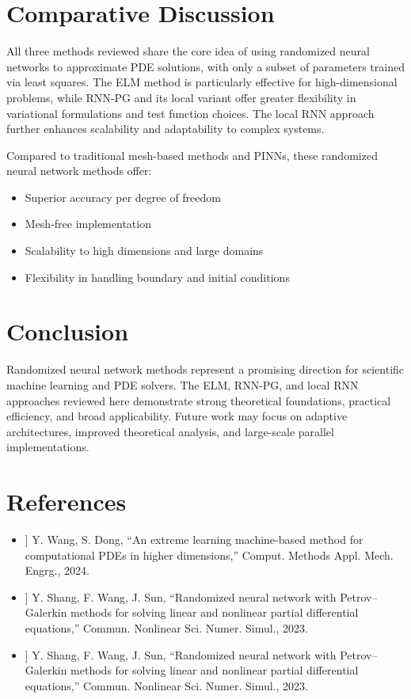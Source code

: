 \documentclass[11pt]{article}
\begin{document}
\section{Comparative Discussion}
All three methods reviewed share the core idea of using randomized neural networks to approximate PDE solutions, with only a subset of parameters trained via least squares. The ELM method is particularly effective for high-dimensional problems, while RNN-PG and its local variant offer greater flexibility in variational formulations and test function choices. The local RNN approach further enhances scalability and adaptability to complex systems.

Compared to traditional mesh-based methods and PINNs, these randomized neural network methods offer:
\begin{itemize}
    \item Superior accuracy per degree of freedom
    \item Mesh-free implementation
    \item Scalability to high dimensions and large domains
    \item Flexibility in handling boundary and initial conditions
\end{itemize}

\section{Conclusion}
Randomized neural network methods represent a promising direction for scientific machine learning and PDE solvers. The ELM, RNN-PG, and local RNN approaches reviewed here demonstrate strong theoretical foundations, practical efficiency, and broad applicability. Future work may focus on adaptive architectures, improved theoretical analysis, and large-scale parallel implementations.

\section*{References}
\begin{itemize}
    \item[[P1]] Y. Wang, S. Dong, ``An extreme learning machine-based method for computational PDEs in higher dimensions,'' Comput. Methods Appl. Mech. Engrg., 2024.
    \item[[P2]] Y. Shang, F. Wang, J. Sun, ``Randomized neural network with Petrov–Galerkin methods for solving linear and nonlinear partial differential equations,'' Commun. Nonlinear Sci. Numer. Simul., 2023.
    \item[[P3]] Y. Shang, F. Wang, J. Sun, ``Randomized neural network with Petrov–Galerkin methods for solving linear and nonlinear partial differential equations,'' Commun. Nonlinear Sci. Numer. Simul., 2023.
\end{itemize}
\end{document}
